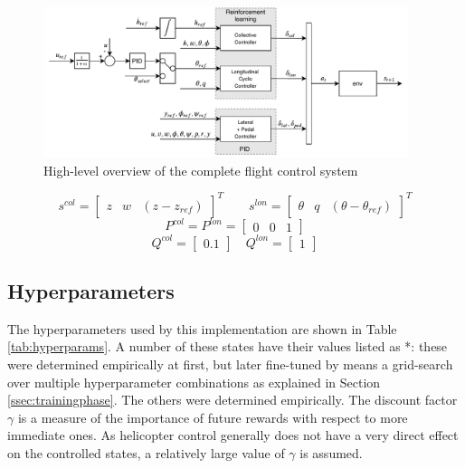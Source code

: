 \begin{figure}[ht]
    \centering
    \includegraphics[width = 0.95\textwidth]{fig/3/controldiagram.pdf}
    \caption{High-level overview of the complete flight control system}
    \label{fig:controlsystem}
\end{figure}

\begin{equation} \label{eq:state_loncol}
    s^{col} = \begin{bmatrix} z & w & (z-z_{ref}) \end{bmatrix}^T \qquad s^{lon} = \begin{bmatrix} \theta & q & (\theta-\theta_{ref}) \end{bmatrix}^T
\end{equation}
\begin{equation} \label{eq:matrices_col}
    P^{col} = P^{lon} = \begin{bmatrix} 0 & 0 & 1 \end{bmatrix}
\end{equation}
\begin{equation} \label{eq:matrices_lon}
    Q^{col} = \begin{bmatrix} 0.1 \end{bmatrix} \quad Q^{lon} = \begin{bmatrix} 1 \end{bmatrix}
\end{equation}

\subsection{Hyperparameters} \label{ssec:hyperparameters}
The hyperparameters used by this implementation are shown in Table \ref{tab:hyperparams}. A number of these states have their values listed as *: these were determined empirically at first, but later fine-tuned by means a grid-search over multiple hyperparameter combinations as explained in Section \ref{ssec:trainingphase}. The others were determined empirically. The discount factor $\gamma$ is a measure of the importance of future rewards with respect to more immediate ones. As helicopter control generally does not have a very direct effect on the controlled states, a relatively large value of $\gamma$ is assumed. 

